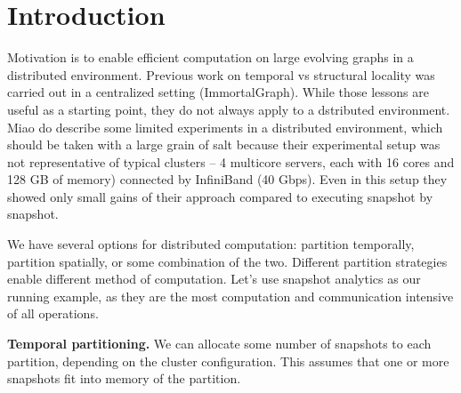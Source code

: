 \section{Introduction}
\label{sec:intro}

Motivation is to enable efficient computation on large evolving graphs
in a distributed environment.  Previous work on temporal vs structural
locality was carried out in a centralized setting (ImmortalGraph).
While those lessons are useful as a starting point, they do not always
apply to a dstributed environment.  Miao do describe some limited
experiments in a distributed environment, which should be taken with a
large grain of salt because their experimental setup was not
representative of typical clusters -- 4 multicore servers, each with
16 cores and 128 GB of memory) connected by InfiniBand (40 Gbps).
Even in this setup they showed only small gains of their approach
compared to executing snapshot by snapshot.

We have several options for distributed computation: partition
temporally, partition spatially, or some combination of the two.
Different partition strategies enable different method of computation.
Let's use snapshot analytics as our running example, as they are the
most computation and communication intensive of all operations.

{\bf Temporal partitioning.}  We can allocate some number of snapshots
to each partition, depending on the cluster configuration.  This
assumes that one or more snapshots fit into memory of the partition.
